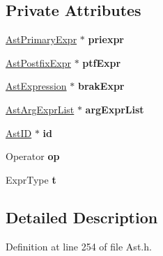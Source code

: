 \subsection*{Private Attributes}
\begin{DoxyCompactItemize}
\item 
\hypertarget{classAstPostfixExpr_ab32946de267a04772cb217027fe9c9b8}{\hyperlink{classAstPrimaryExpr}{Ast\-Primary\-Expr} $\ast$ {\bfseries priexpr}}\label{classAstPostfixExpr_ab32946de267a04772cb217027fe9c9b8}

\item 
\hypertarget{classAstPostfixExpr_a583819dd1730194c4fe61670b96ec07d}{\hyperlink{classAstPostfixExpr}{Ast\-Postfix\-Expr} $\ast$ {\bfseries ptf\-Expr}}\label{classAstPostfixExpr_a583819dd1730194c4fe61670b96ec07d}

\item 
\hypertarget{classAstPostfixExpr_a09da0e8c21732bdc687ad16482ad4b8d}{\hyperlink{classAstExpression}{Ast\-Expression} $\ast$ {\bfseries brak\-Expr}}\label{classAstPostfixExpr_a09da0e8c21732bdc687ad16482ad4b8d}

\item 
\hypertarget{classAstPostfixExpr_afd11b0643a6cd15d44ff5e0f8efce073}{\hyperlink{classAstArgExprList}{Ast\-Arg\-Expr\-List} $\ast$ {\bfseries arg\-Expr\-List}}\label{classAstPostfixExpr_afd11b0643a6cd15d44ff5e0f8efce073}

\item 
\hypertarget{classAstPostfixExpr_a6f80889a19357bf0301d556f37d9874e}{\hyperlink{classAstID}{Ast\-I\-D} $\ast$ {\bfseries id}}\label{classAstPostfixExpr_a6f80889a19357bf0301d556f37d9874e}

\item 
\hypertarget{classAstPostfixExpr_a0fe57762bbd015e8926114828922b514}{Operator {\bfseries op}}\label{classAstPostfixExpr_a0fe57762bbd015e8926114828922b514}

\item 
\hypertarget{classAstPostfixExpr_a8161987dad87df4cbc69cdcebba46610}{Expr\-Type {\bfseries t}}\label{classAstPostfixExpr_a8161987dad87df4cbc69cdcebba46610}

\end{DoxyCompactItemize}


\subsection{Detailed Description}


Definition at line 254 of file Ast.\-h.



